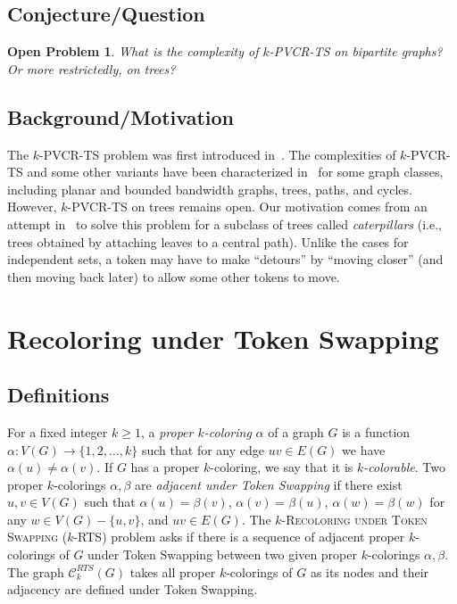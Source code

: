 \documentclass[a4paper]{article}
\newtheorem{problem}[theorem]{Open Problem}
\theoremstyle{definition}
\theoremstyle{remark}
\numberwithin{equation}{section}
\begin{document}
\subsection{Conjecture/Question}

\begin{problem}\label{kPVCR-trees}
	What is the complexity of \textsc{$k$-PVCR-TS} on bipartite graphs? Or more restrictedly, on trees?
\end{problem}

\subsection{Background/Motivation}

The \textsc{$k$-PVCR-TS} problem was first introduced in~\cite{journals/ieicet/HoangSY22}.
The complexities of \textsc{$k$-PVCR-TS} and some other variants have been characterized in~\cite{journals/ieicet/HoangSY22} for some graph classes, including planar and bounded bandwidth graphs, trees, paths, and cycles.
However, \textsc{$k$-PVCR-TS} on trees remains open.
Our motivation comes from an attempt in~\cite{journals/corr/Hoang22} to solve this problem for a subclass of trees called \textit{caterpillars} (i.e., trees obtained by attaching leaves to a central path).
Unlike the cases for independent sets, a token may have to make ``detours'' by  ``moving closer'' (and then moving back later) to allow some other tokens to move.

\section{Recoloring under Token Swapping}

\subsection{Definitions}

For a fixed integer $k \geq 1$, a \textit{proper $k$-coloring} $\alpha$ of a graph $G$ is a function $\alpha: V(G) \to \{1, 2, \dots, k\}$ such that for any edge $uv \in E(G)$ we have $\alpha(u) \neq \alpha(v)$.
If $G$ has a proper $k$-coloring, we say that it is \textit{$k$-colorable}.
Two proper $k$-colorings $\alpha, \beta$ are \textit{adjacent under Token Swapping} if there exist $u, v \in V(G)$ such that $\alpha(u) = \beta(v)$, $\alpha(v) = \beta(u)$, $\alpha(w) = \beta(w)$ for any $w \in V(G) - \{u, v\}$, and $uv \in E(G)$.
The \textsc{$k$-Recoloring under Token Swapping ($k$-RTS)} problem asks if there is a sequence of adjacent proper $k$-colorings of $G$ under Token Swapping between two given proper $k$-colorings $\alpha, \beta$.
The graph $\mathcal{C}_k^{RTS}(G)$ takes all proper $k$-colorings of $G$ as its nodes and their adjacency are defined under Token Swapping.
\end{document}
